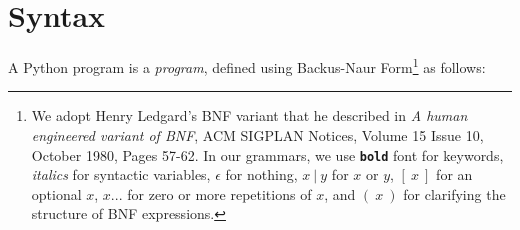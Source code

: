 \section{Syntax}

A Python program is a \emph{program}, defined using Backus-Naur Form\footnote{
We adopt Henry Ledgard's BNF variant that he described in
\emph{A human engineered variant of BNF}, ACM SIGPLAN Notices, Volume 15 Issue 10,
October 1980, Pages 57-62. In our grammars, we use \textbf{\texttt{bold}} font for keywords,
{\it italics} for syntactic variables, $\epsilon$ for nothing,
$x\ |\ y$ for $x$ or $y$, $[\ x\ ]$ for an optional $x$,
$ x ...$ for zero or more repetitions of $x$, and $(\ x\ )$ for clarifying the structure of BNF expressions.}
as follows:
